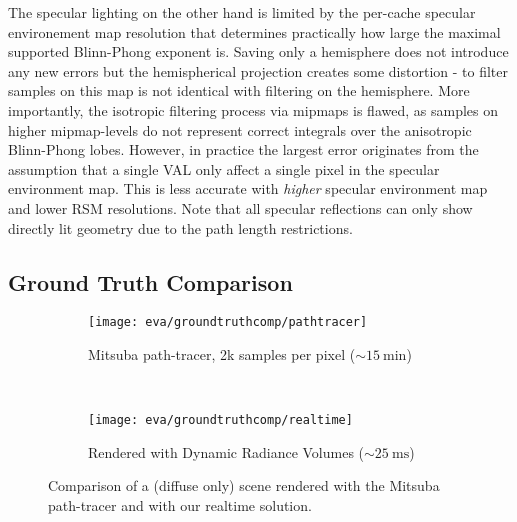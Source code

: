 \documentclass[thesis.tex]{subfiles}
\begin{document}
The specular lighting on the other hand is limited by the per-cache specular environement map resolution that determines practically how large the maximal supported Blinn-Phong exponent is.
Saving only a hemisphere does not introduce any new errors but the hemispherical projection creates some distortion - to filter samples on this map is not identical with filtering on the hemisphere.
More importantly, the isotropic filtering process via mipmaps is flawed, as samples on higher mipmap-levels do not represent correct integrals over the anisotropic Blinn-Phong lobes.
However, in practice the largest error originates from the assumption that a single VAL only affect a single pixel in the specular environment map.
This is less accurate with \emph{higher} specular environment map and lower RSM resolutions.
Note that all specular reflections can only show directly lit geometry due to the path length restrictions.



%

\subsection{Ground Truth Comparison}
\begin{figure}[h]
\centering
\begin{subfigure}[b]{0.7\textwidth}
\texttt{[image: eva/groundtruthcomp/pathtracer]}
\caption{Mitsuba \cite{bib:mitsuba} path-tracer, 2k samples per pixel ($\sim\SI{15}{\minute}$)}
\end{subfigure}
\\
\begin{subfigure}[b]{0.7\textwidth}
\texttt{[image: eva/groundtruthcomp/realtime]}
\caption{Rendered with Dynamic Radiance Volumes ($\sim\SI{25}{\milli\second}$)}
\end{subfigure}
\caption{Comparison of a (diffuse only) scene rendered with the Mitsuba \cite{bib:mitsuba} path-tracer and with our realtime solution.}
\label{fig:groundtruthcomparision}
\end{figure}
\end{document}
